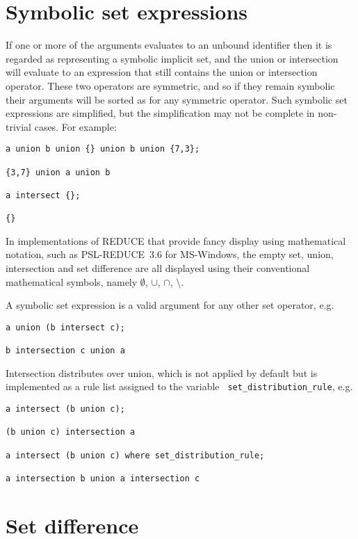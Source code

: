 \section{Symbolic set expressions}

If one or more of the arguments evaluates to an unbound identifier
then it is regarded as representing a symbolic implicit set, and the
union or intersection will evaluate to an expression that still
contains the union or intersection operator.  These two operators are
symmetric, and so if they remain symbolic their arguments will be
sorted as for any symmetric operator.  Such symbolic set expressions
are simplified, but the simplification may not be complete in
non-trivial cases.  For example:
\begin{verbatim}
a union b union {} union b union {7,3};

{3,7} union a union b

a intersect {};

{}
\end{verbatim}

In implementations of REDUCE that provide fancy display using
mathematical notation, such as PSL-REDUCE~3.6 for MS-Windows, the
empty set, union, intersection and set difference are all displayed
using their conventional mathematical symbols, namely $\emptyset$,
$\cup$, $\cap$, $\setminus$.

A symbolic set expression is a valid argument for any other set
operator, e.g.
\begin{verbatim}
a union (b intersect c);

b intersection c union a
\end{verbatim}

Intersection distributes over union, which is not applied by default
but is implemented as a rule list assigned to the variable {\tt
set\_distribution\_rule}, e.g.
\begin{verbatim}
a intersect (b union c);

(b union c) intersection a

a intersect (b union c) where set_distribution_rule;

a intersection b union a intersection c
\end{verbatim}


\section{Set difference}

